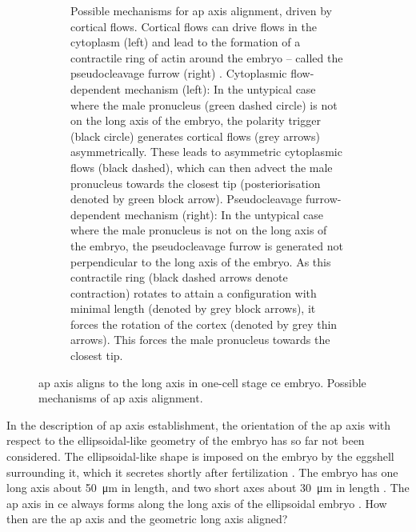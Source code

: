 \begin{figure}
\begin{subfigure}{\textwidth}
    \caption{Possible mechanisms for \acs{ap} axis alignment, driven by cortical flows. Cortical flows can drive flows in the cytoplasm (left) \citep{niwayama2011hydrodynamic} and lead to the formation of a contractile ring of actin around the embryo -- called the pseudocleavage furrow (right) \citep{reymann2016cortical}. Cytoplasmic flow-dependent mechanism (left): In the untypical case where the male pronucleus (green dashed circle) is not on the long axis of the embryo, the polarity trigger (black circle) generates cortical flows (grey arrows) asymmetrically. These leads to asymmetric cytoplasmic flows (black dashed), which can then advect the male pronucleus towards the closest tip (posteriorisation denoted by green block arrow). Pseudocleavage furrow-dependent mechanism (right): In the untypical case where the male pronucleus is not on the long axis of the embryo, the pseudocleavage furrow is generated not perpendicular to the long axis of the embryo. As this contractile ring (black dashed arrows denote contraction) rotates to attain a configuration with minimal length (denoted by grey block arrows), it forces the rotation of the cortex (denoted by grey thin arrows). This forces the male pronucleus towards the closest tip.}
    \label{subfig:apAxisAlignment-mechanisms}
\end{subfigure}

\caption[\acs{ap} axis alignment in \acs{ce}]{\acs{ap} axis aligns to the long axis in one-cell stage \acs{ce} embryo. Possible mechanisms of \acs{ap} axis alignment.}
\label{fig:apAxisAlignment}

\end{figure}

In the description of \ac{ap} axis establishment, the orientation of the \ac{ap} axis with respect to the ellipsoidal-like geometry of the embryo has so far not been considered. The ellipsoidal-like shape is imposed on the embryo by the eggshell surrounding it, which it secretes shortly after fertilization \citep{johnston2012eggshell}. The embryo has one long axis about \SI{50}{\micro\meter} in length, and two short axes about \SI{30}{\micro\meter} in length \citep{begasse2011,riddle1997celegans}. The \ac{ap} axis in \ac{ce} always forms along the long axis of the ellipsoidal embryo \citep{goldstein1996specification}. How then are the \ac{ap} axis and the geometric long axis aligned?

